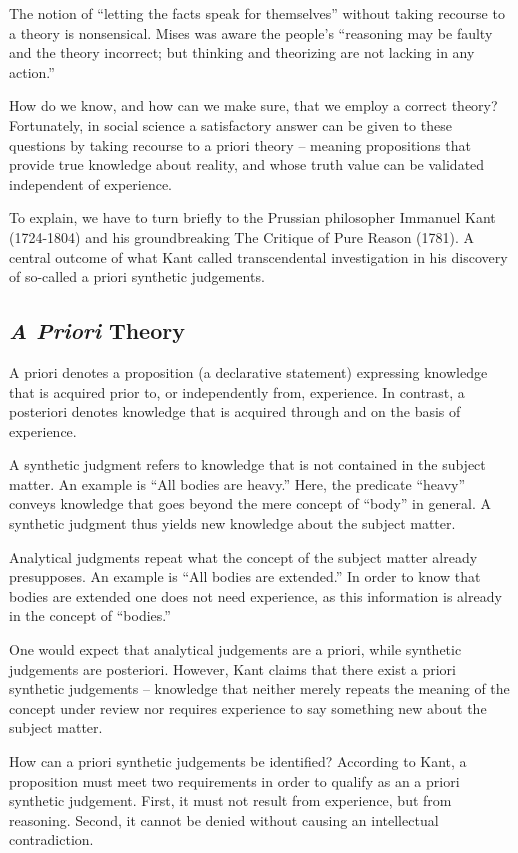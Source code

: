 The notion of ``letting the facts speak for themselves'' without taking recourse to a theory is nonsensical. Mises was aware the people’s ``reasoning may be faulty and the theory incorrect; but thinking and theorizing are not lacking in any action.''

How do we know, and how can we make sure, that we employ a correct theory?  Fortunately, in social science a satisfactory answer can be given to these questions by taking recourse to a priori theory – meaning propositions that provide true knowledge about reality, and whose truth value can be validated independent of experience.

To explain, we have to turn briefly to the Prussian philosopher Immanuel Kant (1724-1804) and his groundbreaking The Critique of Pure Reason (1781). A central outcome of what Kant called transcendental investigation in his discovery of so-called a priori synthetic judgements.
    
\subsection{\textit{A Priori} Theory}

A priori denotes a proposition (a declarative statement) expressing knowledge that is acquired prior to, or independently from, experience. In contrast, a posteriori denotes knowledge that is acquired through and on the basis of experience.

A synthetic judgment refers to knowledge that is not contained in the subject matter. An example is ``All bodies are heavy.''  Here, the predicate ``heavy'' conveys knowledge that goes beyond the mere concept of ``body'' in general. A synthetic judgment thus yields new knowledge about the subject matter.

Analytical judgments repeat what the concept of the subject matter already presupposes. An example is ``All bodies are extended.''  In order to know that bodies are extended one does not need experience, as this information is already in the concept of ``bodies.''

One would expect that analytical judgements are a priori, while synthetic judgements are posteriori. However, Kant claims that there exist a priori synthetic judgements – knowledge that neither merely repeats the meaning of the concept under review nor requires experience to say something new about the subject matter.

How can a priori synthetic judgements be identified?  According to Kant, a proposition must meet two requirements in order to qualify as an a priori synthetic judgement. First, it must not result from experience, but from reasoning. Second, it cannot be denied without causing an intellectual contradiction.

